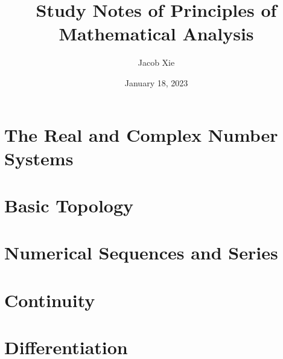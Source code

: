 \documentclass[UTF8]{ctexart}
\title{Study Notes of Principles of Mathematical Analysis}
\author{Jacob Xie}
\date{January 18, 2023}
\theoremstyle{thm}
\theoremstyle{dfn}
\theoremstyle{named}
\begin{document}
\maketitle
\newpage

\section{The Real and Complex Number Systems}

\newpage

\section{Basic Topology}




\newpage

\section{Numerical Sequences and Series}











% 
% 
% 
\newpage

\section{Continuity}
% 
\newpage

\section{Differentiation}
% 
\newpage
\end{document}
